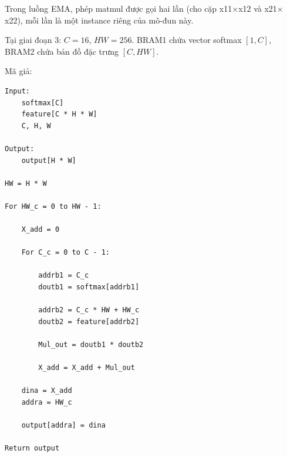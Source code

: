 \documentclass{uetgraduation}
\begin{document}
Trong luồng EMA, phép matmul được gọi hai lần (cho cặp x11$\times$x12
và x21$\times$x22), mỗi lần là một instance riêng của mô-đun này.

Tại giai đoạn 3: $C = 16$, $HW = 256$. BRAM1 chứa vector softmax
$[1, C]$, BRAM2 chứa bản đồ đặc trưng $[C, HW]$.

Mã giả:
\begin{Verbatim}[frame=single]
Input:
    softmax[C]
    feature[C * H * W]
    C, H, W

Output:
    output[H * W]

HW = H * W

For HW_c = 0 to HW - 1:

    X_add = 0

    For C_c = 0 to C - 1:

        addrb1 = C_c
        doutb1 = softmax[addrb1]

        addrb2 = C_c * HW + HW_c
        doutb2 = feature[addrb2]

        Mul_out = doutb1 * doutb2

        X_add = X_add + Mul_out

    dina = X_add
    addra = HW_c

    output[addra] = dina

Return output
\end{Verbatim}
\end{document}
